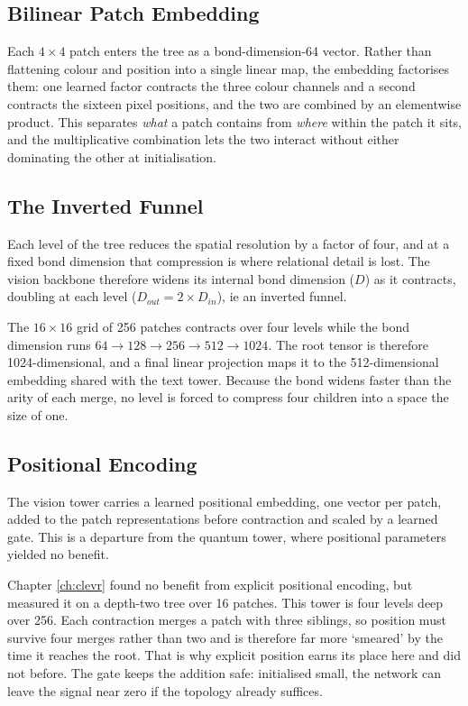 \documentclass[12pt, a4paper, oneside]{report}
\begin{document}
\subsection{Bilinear Patch Embedding}
Each $4 \times 4$ patch enters the tree as a bond-dimension-64 vector. Rather than flattening colour and position into a single linear map, the embedding factorises them: one learned factor contracts the three colour channels and a second contracts the sixteen pixel positions, and the two are combined by an elementwise product. This separates \textit{what} a patch contains from \textit{where} within the patch it sits, and the multiplicative combination lets the two interact without either dominating the other at initialisation.

\subsection{The Inverted Funnel}
Each level of the tree reduces the spatial resolution by a factor of four, and at a fixed bond dimension that compression is where relational detail is lost. The vision backbone therefore widens its internal bond dimension ($D$) as it contracts, doubling at each level ($D_{out} = 2 \times D_{in}$), ie  an inverted funnel.

The $16 \times 16$ grid of 256 patches contracts over four levels while the bond dimension runs $64 \to 128 \to 256 \to 512 \to 1024$. The root tensor is therefore 1024-dimensional, and a final linear projection maps it to the 512-dimensional embedding shared with the text tower. Because the bond widens faster than the arity of each merge, no level is forced to compress four children into a space the size of one.

\subsection{Positional Encoding}
The vision tower carries a learned positional embedding, one vector per patch, added to the patch representations before contraction and scaled by a learned gate. This is a departure from the quantum tower, where positional parameters yielded no benefit.

Chapter \ref{ch:clevr} found no benefit from explicit positional encoding, but measured it on a depth-two tree over 16 patches. This tower is four levels deep over 256. Each contraction merges a patch with three siblings, so position must survive four merges rather than two and is therefore far more `smeared' by the time it reaches the root. That is why explicit position earns its place here and did not before. The gate keeps the addition safe: initialised small, the network can leave the signal near zero if the topology already suffices.
\end{document}
